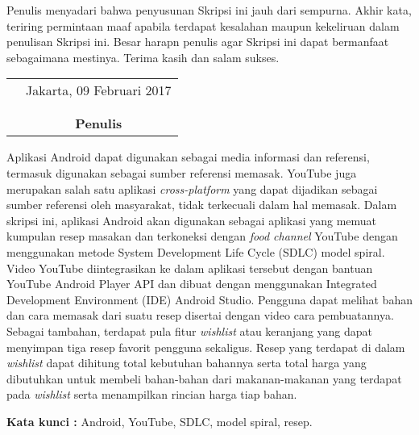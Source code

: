 \documentclass{jtetiskripsi}
\begin{document}
Penulis menyadari bahwa penyusunan Skripsi ini jauh dari sempurna. Akhir kata, teriring permintaan maaf apabila terdapat kesalahan maupun kekeliruan dalam penulisan Skripsi ini. Besar harapn penulis agar Skripsi ini dapat bermanfaat sebagaimana mestinya. Terima kasih dan salam sukses.

\vspace{.5cm}

\begin{tabular}{p{7.5cm}c}
&Jakarta, 09 Februari 2017\\
&\\
&\\
&\textbf{Penulis}
\end{tabular}

\tableofcontents 
{}
\listoffigures
{}
\listoftables
{}

\begin{abstractind}
Aplikasi Android dapat digunakan sebagai media informasi dan referensi, termasuk digunakan sebagai sumber referensi memasak. YouTube juga merupakan salah satu aplikasi \textit{cross-platform} yang dapat dijadikan sebagai sumber referensi oleh masyarakat, tidak terkecuali dalam hal memasak. Dalam skripsi ini, aplikasi Android akan digunakan sebagai aplikasi yang memuat kumpulan resep masakan dan terkoneksi dengan \textit{food channel} YouTube dengan menggunakan metode System Development Life Cycle (SDLC) model spiral. Video YouTube diintegrasikan ke dalam aplikasi tersebut dengan bantuan YouTube Android Player API dan dibuat dengan menggunakan Integrated Development Environment (IDE) Android Studio. Pengguna dapat melihat bahan dan cara memasak dari suatu resep disertai dengan video cara pembuatannya. Sebagai tambahan, terdapat pula fitur \textit{wishlist} atau keranjang yang dapat menyimpan tiga resep favorit pengguna sekaligus. Resep yang terdapat di dalam \textit{wishlist} dapat dihitung total kebutuhan bahannya serta total harga yang dibutuhkan untuk membeli bahan-bahan dari makanan-makanan yang terdapat pada \textit{wishlist} serta menampilkan rincian harga tiap bahan.

\bigskip
\noindent
\textbf{Kata kunci :} Android, YouTube, SDLC, model spiral, resep.
\end{abstractind}
\end{document}
